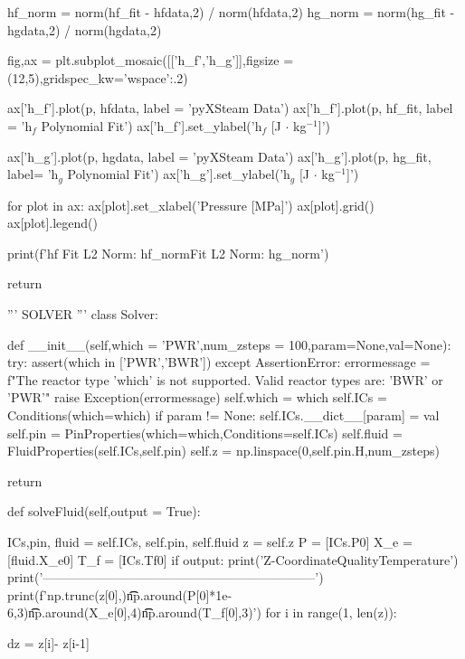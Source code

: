 \documentclass{article}
\begin{document}
\begin{python}
        hf_norm = norm(hf_fit - hfdata,2) / norm(hfdata,2)
        hg_norm = norm(hg_fit - hgdata,2) / norm(hgdata,2)
        
        fig,ax = plt.subplot_mosaic([['h_f','h_g']],figsize = (12,5),gridspec_kw={'wspace':.2})
        
        ax['h_f'].plot(p, hfdata, label = 'pyXSteam Data')
        ax['h_f'].plot(p, hf_fit, label = 'h$_f$ Polynomial Fit')
        ax['h_f'].set_ylabel('h$_f$  [J $\cdot$ kg$^{-1}$]')

        ax['h_g'].plot(p, hgdata, label = 'pyXSteam Data')
        ax['h_g'].plot(p, hg_fit, label= 'h$_{g}$ Polynomial Fit')
        ax['h_g'].set_ylabel('h$_{g}$  [J $\cdot$ kg$^{-1}$]')

        for plot in ax:
            ax[plot].set_xlabel('Pressure  [MPa]')
            ax[plot].grid()
            ax[plot].legend()

        print(f'hf Fit L2 Norm: {hf_norm}\nhg Fit L2 Norm: {hg_norm}')
        
        
        return 
        
'''
SOLVER
'''
class Solver:
    
    def __init__(self,which = 'PWR',num_zsteps = 100,param=None,val=None):
        try:
            assert(which in ['PWR','BWR'])
        except AssertionError:
            errormessage = f"The reactor type '{which}' is not supported. Valid reactor types are: 'BWR' or 'PWR'"
            raise Exception(errormessage)
        self.which = which
        self.ICs = Conditions(which=which)
        if param != None:
            self.ICs.__dict__[param] = val
        self.pin = PinProperties(which=which,Conditions=self.ICs)
        self.fluid = FluidProperties(self.ICs,self.pin)
        self.z = np.linspace(0,self.pin.H,num_zsteps)
        
        return


    def solveFluid(self,output = True):
        
        ICs,pin, fluid = self.ICs, self.pin, self.fluid
        z = self.z
        P = [ICs.P0]
        X_e = [fluid.X_e0]
        T_f = [ICs.Tf0]
        if output:
            print('Z-Coordinate\tPressure\tSteam Quality\tFluid Temperature')
            print('-----------------------------------------------------------------')
            print(f'{np.trunc(z[0],)}\t\t{np.around(P[0]*1e-6,3)}\t\t{np.around(X_e[0],4)}\t\t{np.around(T_f[0],3)}')
        for i in range(1, len(z)):
            
            dz = z[i]- z[i-1]
            

\end{python}
\end{document}
